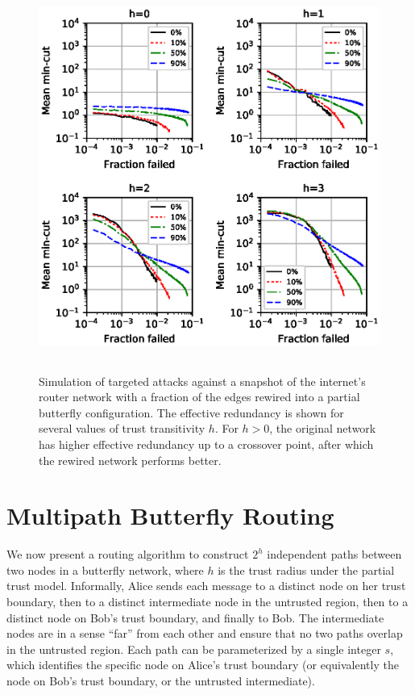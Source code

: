 \documentclass[10pt,letterpaper]{article}
\begin{document}
\begin{figure}[h!]
\centerline{\includegraphics[width=5in,height=5in]{fig-mincut}}
\caption{
Simulation of targeted attacks against a snapshot of the internet's router
network with a fraction of the edges rewired into a partial butterfly configuration.
The effective redundancy is shown for several values of trust transitivity $h$.
For $h>0$, the original network has higher effective redundancy up to a crossover point,
after which the rewired network performs better.
}
\label{fig:mincut}
\end{figure}

\section*{Multipath Butterfly Routing}
\label{sec-bf-route}

We now present a routing algorithm to construct $2^h$ independent paths
between two nodes in a butterfly network,
where $h$ is the trust radius under the partial trust model.
Informally, Alice sends each message to a distinct node on her
trust boundary, then to a distinct intermediate node in the untrusted region,
then to a distinct node on Bob's trust boundary, and finally to Bob.
The intermediate nodes are in a sense ``far'' from each other and ensure that
no two paths overlap in the untrusted region.
Each path can be parameterized by a single integer $s$, which identifies
the specific node on Alice's trust boundary
(or equivalently the node on Bob's trust boundary, or the untrusted intermediate).
\end{document}
